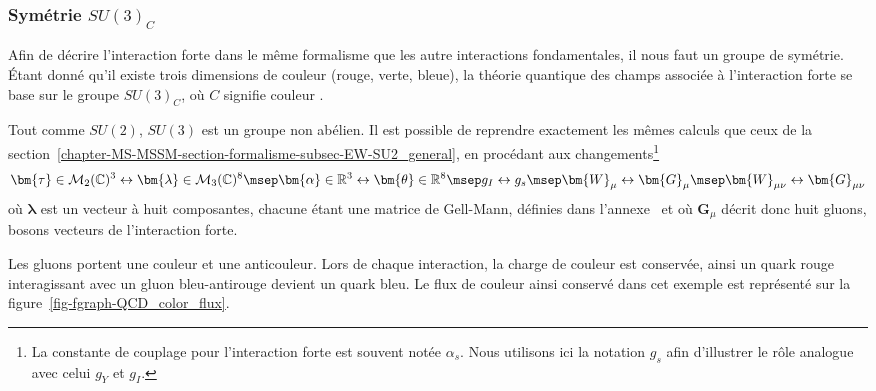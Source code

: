 \subsubsection{Symétrie $SU(3)_C$}\label{chapter-MS-MSSM-section-formalisme-subsec-QCD-subsubsec-SU3C}
Afin de décrire l'interaction forte dans le même formalisme que les autre interactions fondamentales, il nous faut un groupe de symétrie. Étant donné qu'il existe trois dimensions de couleur (rouge, verte, bleue), la théorie quantique des champs associée à l'interaction forte se base sur le groupe $SU(3)_C$, où $C$ signifie \og couleur \fg.
\par Tout comme $SU(2)$, $SU(3)$ est un groupe non abélien. Il est possible de reprendre exactement les mêmes calculs que ceux de la section~\ref{chapter-MS-MSSM-section-formalisme-subsec-EW-SU2_general}, en procédant aux changements\footnote{La constante de couplage pour l'interaction forte est souvent notée $\alpha_s$. Nous utilisons ici la notation $g_s$ afin d'illustrer le rôle analogue avec celui $g_Y$ et $g_I$.}
\begin{equation}
\bm{\tau} \in \mathcal{M}_2(\mathbb{C})^3 \leftrightarrow \bm{\lambda} \in \mathcal{M}_3(\mathbb{C})^8
\msep
\bm{\alpha}\in\mathbb{R}^3 \leftrightarrow \bm{\theta}\in\mathbb{R}^8
\msep
g_I \leftrightarrow g_s
\msep
\bm{W}_\mu \leftrightarrow \bm{G}_\mu
\msep
\bm{W}_{\mu\nu} \leftrightarrow \bm{G}_{\mu\nu}
\label{eq-chapter-MS-MSSM-section-formalisme-subsec-QCD-subsubsec-SU3C-analogieSU2}
\end{equation}
où $\bm{\lambda}$ est un vecteur à huit composantes, chacune étant une matrice de Gell-Mann, définies dans l'annexe~ et où $\bm{G}_\mu$ décrit donc huit gluons, bosons vecteurs de l'interaction forte.
\par Les gluons portent une couleur et une anticouleur. Lors de chaque interaction, la charge de couleur est conservée, ainsi un quark rouge interagissant avec un gluon bleu-antirouge devient un quark bleu. Le flux de couleur ainsi conservé dans cet exemple est représenté sur la figure~\ref{fig-fgraph-QCD_color_flux}.
